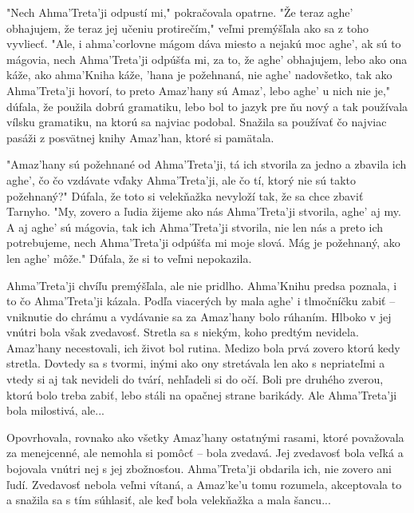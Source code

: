 \documentclass{book}
\begin{document}
"$ $Nech Ahma'Treta'ji odpustí mi,"$ $ pokračovala opatrne. "$ $Že teraz aghe' obhajujem, že teraz jej učeniu protirečím,"$ $ veľmi premýšľala ako sa z toho vyvliecť. "$ $Ale, i ahma'corlovne mágom dáva miesto a nejakú moc aghe', ak sú to mágovia, nech Ahma'Treta'ji odpúšťa mi, za to, že aghe' obhajujem, lebo ako ona káže, ako ahma'Kniha káže, 'hana je požehnaná, nie aghe' nadovšetko, tak ako Ahma'Treta'ji hovorí, to preto Amaz'hany sú Amaz', lebo aghe' u nich nie je,"$ $ dúfala, že použila dobrú gramatiku, lebo bol to jazyk pre ňu nový a tak používala vílsku gramatiku, na ktorú sa najviac podobal. Snažila sa používať čo najviac pasáži z posvätnej knihy Amaz'han, ktoré si pamätala.

"$ $Amaz'hany sú požehnané od Ahma'Treta'ji, tá ich stvorila za jedno a zbavila ich aghe', čo čo vzdávate vďaky Ahma'Treta'ji, ale čo tí, ktorý nie sú takto požehnaný?"$ $ Dúfala, že toto si velekňažka nevyloží tak, že sa chce zbaviť Tarnyho. "$ $My, zovero a ľudia žijeme ako nás Ahma'Treta'ji stvorila, aghe' aj my. A aj aghe' sú mágovia, tak ich Ahma'Treta'ji stvorila, nie len nás a preto ich potrebujeme, nech Ahma'Treta'ji odpúšťa mi moje slová. Mág je požehnaný, ako len aghe' môže."$ $ Dúfala, že si to veľmi nepokazila.

Ahma'Treta'ji chvíľu premýšľala, ale nie pridlho. Ahma'Knihu predsa poznala, i to čo Ahma'Treta'ji kázala. Podľa viacerých by mala aghe' i tlmočníčku zabiť – vniknutie do chrámu a vydávanie sa za Amaz'hany bolo rúhaním. Hlboko v jej vnútri bola však zvedavosť. Stretla sa s niekým, koho predtým nevidela. Amaz'hany necestovali, ich život bol rutina. Medizo bola prvá zovero ktorú kedy stretla. Dovtedy sa s tvormi, inými ako ony stretávala len ako s nepriateľmi a vtedy si aj tak nevideli do tvárí, nehľadeli si do očí. Boli pre druhého zverou, ktorú bolo treba zabiť, lebo stáli na opačnej strane barikády. Ale Ahma'Treta'ji bola milostivá, ale...

Opovrhovala, rovnako ako všetky Amaz'hany ostatnými rasami, ktoré považovala za menejcenné, ale nemohla si pomôcť – bola zvedavá. Jej zvedavosť bola veľká a bojovala vnútri nej s jej zbožnosťou. Ahma'Treta'ji obdarila ich, nie zovero ani ľudí. Zvedavosť nebola veľmi vítaná, a Amaz'ke'u tomu rozumela, akceptovala to a snažila sa s tím súhlasiť, ale keď bola velekňažka a mala šancu...
\end{document}
